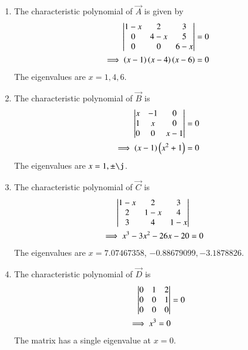 \begin{enumerate}[label=\thesubsection.\arabic*.,ref=\thesubsection.\theenumi]

\item The characteristic polynomial of $\vec{A}$ is given by
\begin{align}
\begin{vmatrix}1-x &2&3\\0&4-x&5\\0&0&6-x\end{vmatrix} &= 0
\\
\implies \left(x-1\right) \left(x-4\right) \left(x-6\right)&= 0
\end{align}
%
The eigenvalues are $x = 1,4,6$.
\item The characteristic polynomial of $\vec{B}$ is 
\begin{align}
\begin{vmatrix}x&-1&0\\1&x&0\\0&0&x-1\end{vmatrix} &= 0
\\
\implies \left(x-1\right)\left(x^2+1\right)&= 0
\end{align}
%
The eigenvalues are $x = 1, \pm \j$.
\item The characteristic polynomial of $\vec{C}$ is 
\begin{align}
\begin{vmatrix}1-x&2&3\\2&1-x&4\\3&4&1-x\end{vmatrix}
\\
\implies x^3 - 3x^2 - 26x - 20 &=0
\end{align}
%
The eigenvalues are $x = 7.07467358$, $-0.88679099, -3.1878826$.
\item The characteristic polynomial of $\vec{D}$ is 
\begin{align}
\begin{vmatrix}0&1&2\\0&0&1\\0&0&0\end{vmatrix} &=0
\\
\implies x^3 = 0
\end{align}
%
The matrix has a single eigenvalue at $x = 0$.
\end{enumerate}
